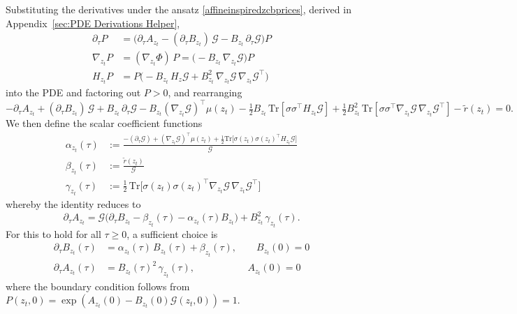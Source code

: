Substituting the derivatives under the ansatz \eqref{affineinspiredzcbprices}, derived in Appendix~\ref{sec:PDE Derivations Helper},
\begin{align}
    \partial_\tau P
&=
\Big(
\partial_\tau A_{z_t}
-
(\partial_\tau B_{z_t})\,\mathcal{G}
-
B_{z_t}\,\partial_\tau \mathcal{G}
\Big)P\\
\nabla_{z_t} P
&=
(\nabla_{z_t} \Phi)\,P=
\big(-B_{z_t}\,\nabla_{z_t} \mathcal{G}\big)P\\
H_{z_t} P&=
P\Big(
-B_{z_t}\,H_z \mathcal{G}
+
B_{z_t}^2\,\nabla_{z_t} \mathcal{G}\,\nabla_{z_t} \mathcal{G}^\top
\Big)
\end{align}
into the PDE and factoring out $P>0$, and rearranging
\[
-\partial_\tau A_{z_t} + (\partial_\tau B_{z_t})\,\mathcal{G} + B_{z_t}\,\partial_\tau\mathcal{G} - B_{z_t}(\nabla_{z_t}\mathcal{G})^\top\mu(z_t) - \tfrac{1}{2}B_{z_t}\,\mathrm{Tr}\!\left[\sigma\sigma^\top H_{z_t}\mathcal{G}\right] + \tfrac{1}{2}B_{z_t}^2\,\mathrm{Tr}\!\left[\sigma\sigma^\top\nabla_{z_t}\mathcal{G}\,\nabla_{z_t}\mathcal{G}^\top\right] - \tilde{r}(z_t) = 0.
\]
We then define the scalar coefficient functions
\begin{align}
\alpha_{z_t}(\tau)&:=\frac{-(\partial_\tau \mathcal{G})+(\nabla_{z_t} \mathcal{G})^\top \mu({z_t})+\tfrac12 \mathrm{Tr}\!\big[\sigma({z_t})\sigma({z_t})^\top H_{z_t} \mathcal{G}\big]
}{\mathcal{G}}\\
\beta_{z_t}(\tau)&:=\frac{\tilde r(z_t)}{\mathcal{G}}\\
\gamma_{z_t}(\tau)&:=
\frac12\,\mathrm{Tr}\!\Big[\sigma({z_t})\sigma({z_t})^\top \nabla_{z_t} \mathcal{G}\,\nabla_{z_t} \mathcal{G}^\top\Big]
\end{align}
whereby the identity reduces to
\[
\partial_\tau A_{z_t} = \mathcal{G}\big(\partial_\tau B_{z_t} - \beta_{z_t}(\tau) - \alpha_{z_t}(\tau) B_{z_t}\big) + B_{z_t}^2\,\gamma_{z_t}(\tau).
\]
For this to hold for all $\tau\geq0$, a sufficient choice is
\begin{align}
\partial_\tau B_{z_t}(\tau) &= \alpha_{z_t}(\tau)\,B_{z_t}(\tau) + \beta_{z_t}(\tau),\qquad B_{z_t}(0)=0
\label{ODEB}\\
\partial_\tau A_{z_t}(\tau) &= B_{z_t}(\tau)^2\,\gamma_{z_t}(\tau),\qquad \qquad\;\;\;\;\; A_{z_t}(0)=0
\label{ODEA}
\end{align}
where the boundary condition follows from $P(z_t,0)=\exp(A_{z_t}(0)-B_{z_t}(0)\mathcal{G}(z_t,0))=1$.



